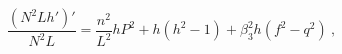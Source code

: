 \begin{equation}
\frac{(N^2Lh')'}{N^2L}=\frac{n^2}{L^2} hP^2+h(h^2-1)+\beta_3^2h(f^2-q^2) \ ,
\end{equation}

